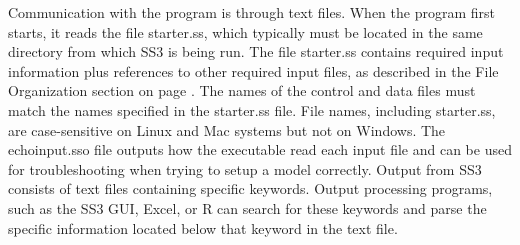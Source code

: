 Communication with the program is through text files.  When the program first starts, it reads the file starter.ss, which typically must be located in the same directory from which SS3 is being run.  The file starter.ss contains required input information plus references to other required input files, as described in the File Organization section on page \pageref{FileOrganization}.  The names of the control and data files must match the names specified in the starter.ss file.  File names, including starter.ss, are case-sensitive on Linux and Mac systems but not on Windows. The echoinput.sso file outputs how the executable read each input file and can be used for troubleshooting when trying to setup a model correctly.  Output from SS3 consists of text files containing specific keywords.  Output processing programs, such as the SS3 GUI, Excel, or R can search for these keywords and parse the specific information located below that keyword in the text file.

\pagebreak